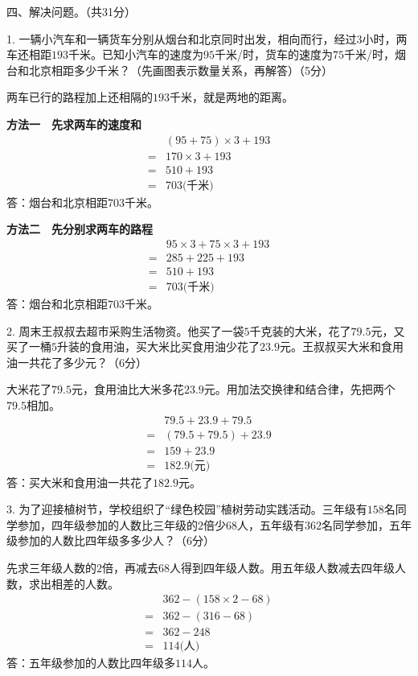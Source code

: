 四、解决问题。（共31分）\par 1. 一辆小汽车和一辆货车分别从烟台和北京同时出发，相向而行，经过\(3\)小时，两车还相距\(193\)千米。已知小汽车的速度为\(95\)千米/时，货车的速度为\(75\)千米/时，烟台和北京相距多少千米？（先画图表示数量关系，再解答）（5分）\par
\begin{BookAnswer}
两车已行的路程加上还相隔的\(193\)千米，就是两地的距离。\par
\textbf{方法一　先求两车的速度和}
\[\begin{aligned}&(95+75)\times3+193\\={}&170\times3+193\\={}&510+193\\={}&703\text{(千米)}\end{aligned}\]
答：烟台和北京相距\(703\)千米。\par
\textbf{方法二　先分别求两车的路程}
\[\begin{aligned}&95\times3+75\times3+193\\={}&285+225+193\\={}&510+193\\={}&703\text{(千米)}\end{aligned}\]
答：烟台和北京相距\(703\)千米。
\end{BookAnswer}

2. 周末王叔叔去超市采购生活物资。他买了一袋\(5\)千克装的大米，花了\(79.5\)元，又买了一桶\(5\)升装的食用油，买大米比买食用油少花了\(23.9\)元。王叔叔买大米和食用油一共花了多少元？（6分）\par
\begin{BookAnswer}
大米花了\(79.5\)元，食用油比大米多花\(23.9\)元。用加法交换律和结合律，先把两个\(79.5\)相加。
\[\begin{aligned}&79.5+23.9+79.5\\={}&(79.5+79.5)+23.9\\={}&159+23.9\\={}&182.9\text{(元)}\end{aligned}\]
答：买大米和食用油一共花了\(182.9\)元。
\end{BookAnswer}

3. 为了迎接植树节，学校组织了“绿色校园”植树劳动实践活动。三年级有\(158\)名同学参加，四年级参加的人数比三年级的\(2\)倍少\(68\)人，五年级有\(362\)名同学参加，五年级参加的人数比四年级多多少人？（6分）\par
\begin{BookAnswer}
先求三年级人数的\(2\)倍，再减去\(68\)人得到四年级人数。用五年级人数减去四年级人数，求出相差的人数。
\[\begin{aligned}&362-(158\times2-68)\\={}&362-(316-68)\\={}&362-248\\={}&114\text{(人)}\end{aligned}\]
答：五年级参加的人数比四年级多\(114\)人。
\end{BookAnswer}

